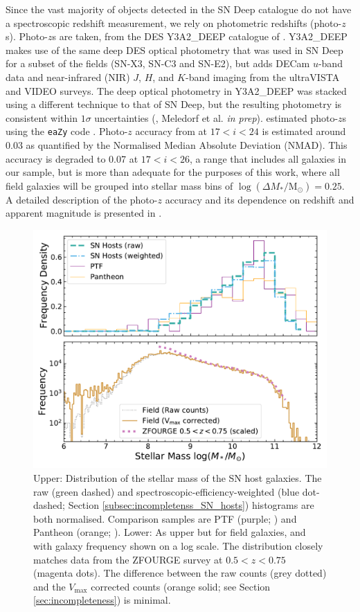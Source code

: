 \documentclass[fleqn,usenatbib]{mnras}
\begin{document}
Since the vast majority of objects detected in the SN Deep catalogue do not have a spectroscopic redshift measurement, we rely on photometric redshifts (photo-$z$s).
Photo-$z$s are taken, from the DES Y3A2\_DEEP catalogue of \citet{Hartley2020}. Y3A2\_DEEP makes use of the same deep DES optical photometry that was used in SN Deep for a subset of the fields (SN-X3, SN-C3 and SN-E2), but adds DECam $u$-band data and near-infrared (NIR) $J$, $H$, and $K$-band imaging from the ultraVISTA and VIDEO surveys. The deep optical photometry in Y3A2\_DEEP was stacked using a different technique to that of SN Deep, but the resulting photometry is consistent within $1\sigma$ uncertainties (\citealt{Wiseman2020}, Meledorf et al. \textit{in prep}). \citet{Hartley2020} estimated photo-$z$s using the \texttt{eaZy} code \citep{Brammer2008}. Photo-$z$ accuracy from \citet{Hartley2020} at $17 < i<24$ is estimated around 0.03 as quantified by the Normalised Median Absolute Deviation (NMAD). This accuracy is degraded to 0.07 at $17 < i<26$, a range that includes all galaxies in our sample, but is more than adequate for the purposes of this work, where all field galaxies will be grouped into stellar mass bins of $\log \left(\Delta M_*/\mathrm{M}_{\odot}\right) = 0.25$. A detailed description of the photo-$z$ accuracy and its dependence on redshift and apparent magnitude is presented in \citet{Hartley2020}.

\begin{figure}
    \centering
    \includegraphics[width=.5\textwidth]{figs/mass_hist_linlog_sn_field_BC03.pdf}
    \caption{Upper: Distribution of the stellar mass of the SN host galaxies. The raw (green dashed) and spectroscopic-efficiency-weighted (blue dot-dashed; Section \ref{subsec:incompletenss_SN_hosts}) histograms are both normalised. Comparison samples are PTF (purple; \citealt{Pan2014}) and Pantheon (orange; \citealt{Scolnic2018}). Lower: As upper but for field galaxies, and with galaxy frequency shown on a log scale.  The distribution closely matches data from the ZFOURGE survey at $0.5<z<0.75$ (magenta dots). The difference between the raw counts (grey dotted) and the $V_{\mathrm{max}}$ corrected counts (orange solid; see Section \ref{sec:incompleteness}) is minimal. 
    \label{fig:mass_hist_hosts_field}}
\end{figure}
\end{document}

